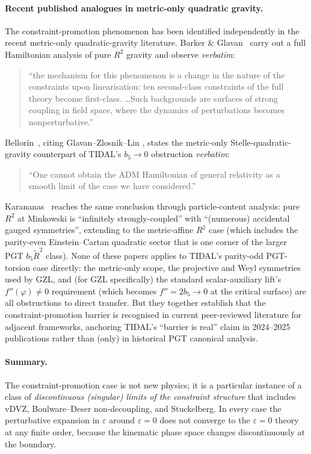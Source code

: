 \paragraph{Recent published analogues in metric-only quadratic gravity.}
The constraint-promotion phenomenon has been identified independently in
the recent metric-only quadratic-gravity literature.  Barker \&
Glavan~\cite{BarkerGlavan2025} carry out a full Hamiltonian analysis of
pure $R^2$ gravity and observe \emph{verbatim}:
\begin{quote}
``the mechanism for this phenomenon is a change in the nature of the
constraints upon linearisation: ten second-class constraints of the
full theory become first-class. \dots Such backgrounds are surfaces of
strong coupling in field space, where the dynamics of perturbations
becomes nonperturbative.''
\end{quote}
Bellor\'in~\cite{Bellorin2025}, citing Glavan--Zlosnik--Lin
\cite{GlavanZlosnikLin2024}, states the metric-only Stelle-quadratic-gravity
counterpart of TIDAL's $b_5 \to 0$ obstruction \emph{verbatim}:
\begin{quote}
``One cannot obtain the ADM Hamiltonian of general relativity as a
smooth limit of the case we have considered.''
\end{quote}
Karananas~\cite{Karananas2024a,Karananas2024b} reaches the same conclusion
through particle-content analysis: pure $R^2$ at Minkowski is
``infinitely strongly-coupled'' with ``(numerous) accidental gauged
symmetries'', extending to the metric-affine $R^2$ case (which includes
the parity-even Einstein--Cartan quadratic sector that is one corner
of the larger PGT $b_5 \tilde{R}^2$ class).  None of these papers
applies to TIDAL's parity-odd PGT-torsion case directly: the
metric-only scope, the projective and Weyl symmetries used by GZL,
and (for GZL specifically) the standard scalar-auxiliary lift's
$f''(\varphi) \neq 0$ requirement (which becomes $f'' = 2 b_5
\to 0$ at the critical surface) are all obstructions to direct
transfer.  But they together establish that the constraint-promotion
barrier is recognised in current peer-reviewed literature for adjacent
frameworks, anchoring TIDAL's ``barrier is real'' claim in 2024--2025
publications rather than (only) in historical PGT canonical analysis.

\paragraph{Summary.}
The constraint-promotion case is not new physics; it is a particular
instance of a class of \emph{discontinuous (singular) limits of the
constraint structure} that includes vDVZ, Boulware--Deser non-decoupling,
and Stuckelberg.  In every case the perturbative expansion in
$\varepsilon$ around $\varepsilon = 0$ does not converge to the
$\varepsilon = 0$ theory at any finite order, because the kinematic
phase space changes discontinuously at the boundary.

